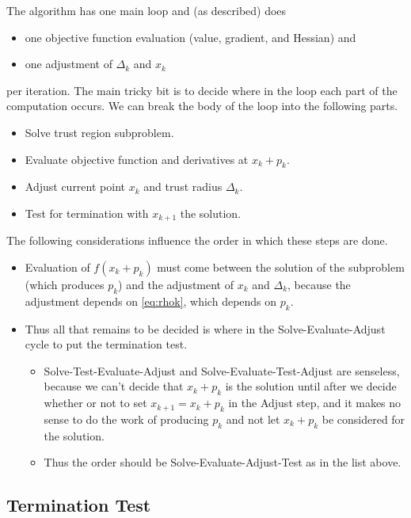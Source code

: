 \documentclass[11pt]{article}
\begin{document}
The algorithm has one main loop and (as described) does
\begin{itemize}
\item one objective function evaluation (value, gradient, and Hessian) and
\item one adjustment of $\Delta_k$ and $x_k$
\end{itemize}
per iteration.  The main tricky bit is to decide where in the loop
each part of the computation occurs.  We can break the body of the
loop into the following parts.
\begin{itemize}
\item Solve trust region subproblem.
\item Evaluate objective function and derivatives at $x_k + p_k$.
\item Adjust current point $x_k$ and trust radius $\Delta_k$.
\item Test for termination with $x_{k + 1}$ the solution.
\end{itemize}
The following considerations influence the order in which these
steps are done.
\begin{itemize}
\item Evaluation of $f(x_k + p_k)$ must come between the solution
    of the subproblem (which produces $p_k$) and the adjustment of
    $x_k$ and $\Delta_k$, because the adjustment depends on \eqref{eq:rhok},
    which depends on $p_k$.
\item Thus all that remains to be decided is where in the Solve-Evaluate-Adjust
    cycle to put the termination test.
\begin{itemize}
\item Solve-Test-Evaluate-Adjust and Solve-Evaluate-Test-Adjust are
    senseless,
    because we can't decide that $x_k + p_k$ is the solution until after we
    decide whether or not to set $x_{k + 1} = x_k + p_k$ in the Adjust step,
    and it makes no sense to do the work of producing $p_k$ and not let
    $x_k + p_k$ be considered for the solution.
\item Thus the order should be Solve-Evaluate-Adjust-Test as in the list
    above.
\end{itemize}
\end{itemize}

\subsection{Termination Test}
\end{document}
